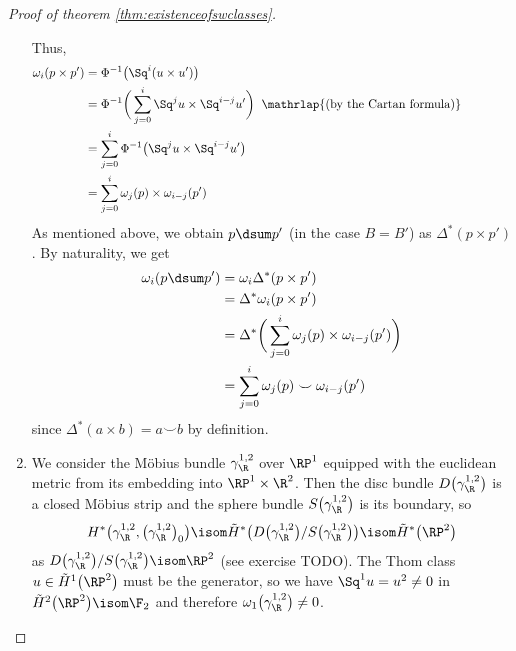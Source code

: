 \begin{proof}[Proof of theorem \ref{thm:existenceofswclasses}]
\begin{enumerate}
			Thus,
			\begin{align*}
				\omega_i(p \times p') &= \Phi^{-1}\big(\Sq^i (u \times u')\big) \\ 
									  &= \Phi^{-1}\bigg(\sum_{j = 0}^i \Sq^j u \times \Sq^{i - j} u'\bigg) \;\;\mathrlap{\text{(by the Cartan formula)}}\qquad\qquad\qquad \\
									  &= \sum_{j = 0}^i \Phi^{-1}\big(\Sq^j u \times \Sq^{i - j} u'\big) \\
									  &= \sum_{j = 0}^i \omega_j(p) \times \omega_{i - j}(p')
			\end{align*}
			As mentioned above, we obtain $p \dsum p'$ (in the case $B = B'$) as $\Delta^*(p \times p')$.
			By naturality, we get 
			\begin{align*}
				\omega_i(p \dsum p') &= \omega_i \Delta^*(p \times p') \\
									 &= \Delta^* \omega_i(p \times p') \\
									 &= \Delta^*\bigg(\sum_{j = 0}^i \omega_j(p) \times \omega_{i - j}(p')\bigg) \\
									 &= \sum_{j = 0}^i \omega_j(p) \smile \omega_{i - j}(p')
			\end{align*}
			since $\Delta^*(a \times b) = a \smile b$ by definition.
		\item We consider the Möbius bundle $\gamma_\R^{1, 2}$ over $\RP^1$ equipped with the euclidean metric from its embedding into $\RP^1 \times \R^2$.
			Then the disc bundle $D\big(\gamma_\R^{1, 2}\big)$ is a closed Möbius strip and the sphere bundle $S\big(\gamma_\R^{1, 2}\big)$ is its boundary, so 
			\begin{equation*}
				H^*\big(\gamma_\R^{1, 2}, \big(\gamma_\R^{1, 2}\big)_0\big) \isom \tilde{H}^*\big(D\big(\gamma_\R^{1, 2}\big) / S\big(\gamma_\R^{1, 2}\big)\big) \isom \tilde{H}^*\big(\RP^2\big)
			\end{equation*}
			as $D\big(\gamma_\R^{1, 2}\big) / S\big(\gamma_\R^{1, 2}\big) \isom \RP^2$ (see exercise TODO).
			The Thom class $u \in \tilde{H}^1\big(\RP^2\big)$ must be the generator, so we have $\Sq^1 u = u^2 \neq 0$ in $\tilde{H}^2\big(\RP^2\big) \isom \F_2$ and therefore $\omega_1\big(\gamma_\R^{1, 2}\big) \neq 0$.
			\qedhere
	\end{enumerate}
\end{proof}

